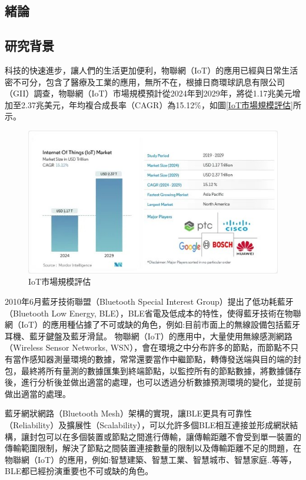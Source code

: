 \begin{ZhChapter}

\chapter{緒論}

\section{研究背景}

科技的快速進步，讓人們的生活更加便利，物聯網（IoT）的應用已經與日常生活密不可分，包含了醫療及工業的應用，無所不在，\cite{mordor2024iot}根據日商環球訊息有限公司（GII）調查，物聯網（IoT）市場規模預計從2024年到2029年，將從1.17兆美元增加至2.37兆美元，年均複合成長率（CAGR）為15.12\%，如圖\ref{IoT市場規模評估}所示。

\begin{figure}[H]
    \centering
    \includegraphics[width = 1\textwidth]{image/market_research.jpg}
    \caption{IoT市場規模評估\cite{mordor2024iot}}
    \label{fig: IoT市場規模評估}
\end{figure}

2010年6月藍牙技術聯盟（Bluetooth Special Interest Group）提出了低功耗藍牙（Bluetooth Low Energy, BLE），BLE省電及低成本的特性，使得藍牙技術在物聯網（IoT）的應用種佔據了不可或缺的角色，例如:目前市面上的無線設備包括藍牙耳機、藍牙鍵盤及藍牙滑鼠。
物聯網（IoT）的應用中，大量使用無線感測網路（Wireless Sensor Networks, WSN），會在環境之中分布許多的節點，而節點不只有當作感知器測量環境的數據，常常還要當作中繼節點，轉傳發送端與目的端的封包，最終將所有量測的數據匯集到終端節點，以監控所有的節點數據，將數據儲存後，進行分析後並做出適當的處理，也可以透過分析數據預測環境的變化，並提前做出適當的處理。

藍牙網狀網路（Bluetooth Mesh）架構的實現，讓BLE更具有可靠性（Reliability）及擴展性（Scalability），可以允許多個BLE相互連接並形成網狀結構，讓封包可以在多個裝置或節點之間進行傳輸，讓傳輸距離不會受到單一裝置的傳輸範圍限制，解決了節點之間裝置連接數量的限制以及傳輸距離不足的問題，在物聯網（IoT）的應用，例如:智慧建築、智慧工業、智慧城市、智慧家庭..等等，BLE都已經扮演重要也不可或缺的角色。
	

\end{ZhChapter}
